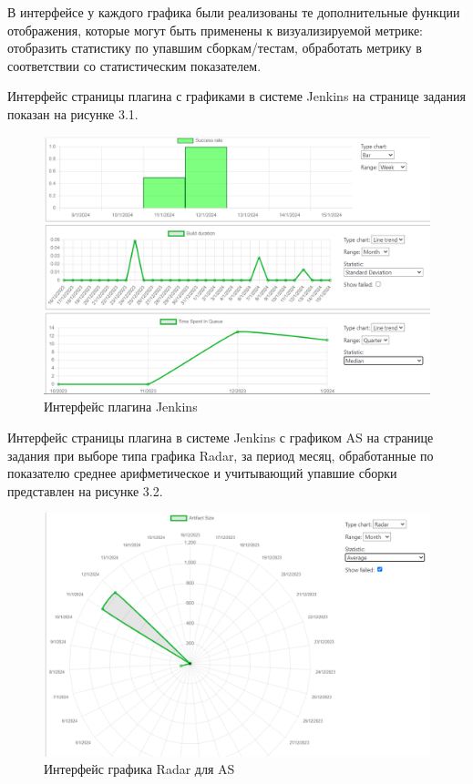 В интерфейсе у каждого графика были реализованы те дополнительные функции отображения, которые могут быть применены к визуализируемой метрике: отобразить статистику по упавшим сборкам/тестам, обработать метрику в соответствии со статистическим показателем.

Интерфейс страницы плагина с графиками в системе Jenkins на странице задания показан на рисунке 3.1.


\begin{figure}[ht!] 
	\center
	\includegraphics [scale=0.47] {my_folder/images//ui12}
	\caption{Интерфейс плагина Jenkins} 
	\label{fig:ui1}  
\end{figure}

Интерфейс страницы плагина в системе Jenkins с графиком AS на странице задания при выборе типа графика Radar, за период месяц, обработанные по показателю среднее арифметическое и учитывающий упавшие сборки представлен на рисунке 3.2.

\begin{figure}[ht!] 
	\center
	\includegraphics [scale=0.47] {my_folder/images//ui22}
	\caption{Интерфейс графика Radar для AS} 
	\label{fig:ui22}  
\end{figure}

